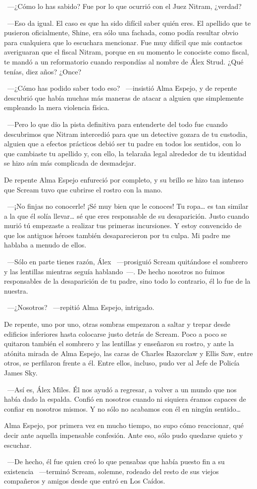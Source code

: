 ~---¿Cómo lo has sabido? Fue por lo que ocurrió con el Juez Nitram, ¿verdad?

~---Eso da igual. El caso es que ha sido difícil saber quién eres. El apellido que te pusieron oficialmente, Shine, era sólo una fachada, como podía resultar obvio para cualquiera que lo escuchara mencionar. Fue muy difícil que mis contactos averiguaran que el fiscal Nitram, porque en su momento le conociste como fiscal, te mandó a un reformatorio cuando respondías al nombre de Álex Strud. ¿Qué tenías, diez años? ¿Once?

~---¿Cómo has podido saber todo eso? ~---insistió Alma Espejo, y de repente descubrió que había muchas más maneras de atacar a alguien que simplemente empleando la mera violencia física.

~---Pero lo que dio la pista definitiva para entenderte del todo fue cuando descubrimos que Nitram intercedió para que un detective gozara de tu custodia, alguien que a efectos prácticos debió ser tu padre en todos los sentidos, con lo que cambiaste tu apellido y, con ello, la telaraña legal alrededor de tu identidad se hizo aún más complicada de desmadejar.

De repente Alma Espejo enfureció por completo, y su brillo se hizo tan intenso que Scream tuvo que cubrirse el rostro con la mano.

~---¡No finjas no conocerle! ¡Sé muy bien que le conoces! Tu ropa… es tan similar a la que él solía llevar… sé que eres responsable de su desaparición. Justo cuando murió tú empezaste a realizar tus primeras incursiones. Y estoy convencido de que los antiguos héroes también desaparecieron por tu culpa. Mi padre me hablaba a menudo de ellos.

~---Sólo en parte tienes razón, Álex ~---prosiguió Scream quitándose el sombrero y las lentillas mientras seguía hablando~---. De hecho nosotros no fuimos responsables de la desaparición de tu padre, sino todo lo contrario, él lo fue de la nuestra.

~---¿Nosotros? ~---repitió Alma Espejo, intrigado.

De repente, uno por uno, otras sombras empezaron a saltar y trepar desde edificios inferiores hasta colocarse justo detrás de Scream. Poco a poco se quitaron también el sombrero y las lentillas y enseñaron su rostro, y ante la atónita mirada de Alma Espejo, las caras de Charles Razorclaw y Ellis Saw, entre otros, se perfilaron frente a él. Entre ellos, incluso, pudo ver al Jefe de Policía James Sky.

~---Así es, Álex Miles. Él nos ayudó a regresar, a volver a un mundo que nos había dado la espalda. Confió en nosotros cuando ni siquiera éramos capaces de confiar en nosotros mismos. Y no sólo no acabamos con él en ningún sentido…

Alma Espejo, por primera vez en mucho tiempo, no supo cómo reaccionar, qué decir ante aquella impensable confesión. Ante eso, sólo pudo quedarse quieto y escuchar.

~---De hecho, él fue quien creó lo que pensabas que había puesto fin a su existencia ~---terminó Scream, solemne, rodeado del resto de sus viejos compañeros y amigos desde que entró en Los Caídos.
